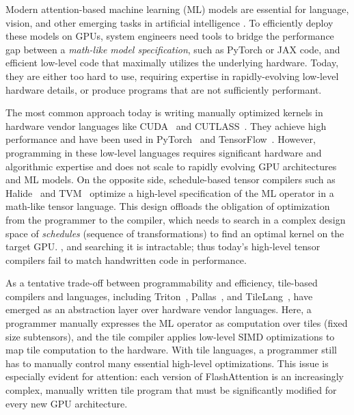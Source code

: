 Modern attention-based machine learning (ML) models
are essential for language, vision, and other emerging tasks in artificial intelligence
\cite{gpt5,image-gen-paper,audio-gen-paper}. To efficiently deploy these models on GPUs,
system engineers need tools to bridge the performance gap
between a \emph{math-like model specification}, such as PyTorch or JAX code, and efficient
low-level code that maximally utilizes the underlying hardware.
Today, 
they are either too hard to use, requiring expertise in rapidly-evolving low-level
hardware details, or produce programs that are not sufficiently performant.

The most common approach today is writing manually optimized kernels in hardware vendor languages
like CUDA~\cite{cuda} and CUTLASS~\cite{cutlass}. They achieve high performance and have been
used in PyTorch~\cite{pytorch} and TensorFlow~\cite{tensorflow}.
However, programming in these low-level languages requires significant hardware and
algorithmic expertise and does not scale to rapidly evolving GPU architectures and ML models.
On the opposite side, schedule-based tensor compilers such as Halide~\cite{halide} and
TVM~\cite{tvm} optimize a high-level specification of the ML operator {in a math-like
tensor language.}
This design offloads the obligation of optimization from the programmer to the compiler,
which needs to search in a complex design space of \emph{schedules}
(sequence of transformations) to find an optimal kernel on the target GPU.
, and searching it is intractable; thus
today's high-level tensor compilers fail to match handwritten code in performance.

As a tentative trade-off between programmability and efficiency,
tile-based compilers and languages,
including Triton~\cite{triton}, Pallas~\cite{pallas}, and TileLang~\cite{tilelang},
have emerged as an abstraction layer over hardware vendor languages.
Here, a programmer manually expresses the ML operator as computation over tiles (fixed
size subtensors), and the tile compiler applies low-level SIMD
optimizations to map tile computation to the hardware.
With tile languages, a programmer still has to manually control many essential
high-level optimizations. This issue is especially evident for attention:
each version of FlashAttention
\cite{flash-attention,flash-attention-2,flash-decoding,flash-attention-3}
is an increasingly complex, manually written tile program
that must be significantly modified for every new GPU architecture.


